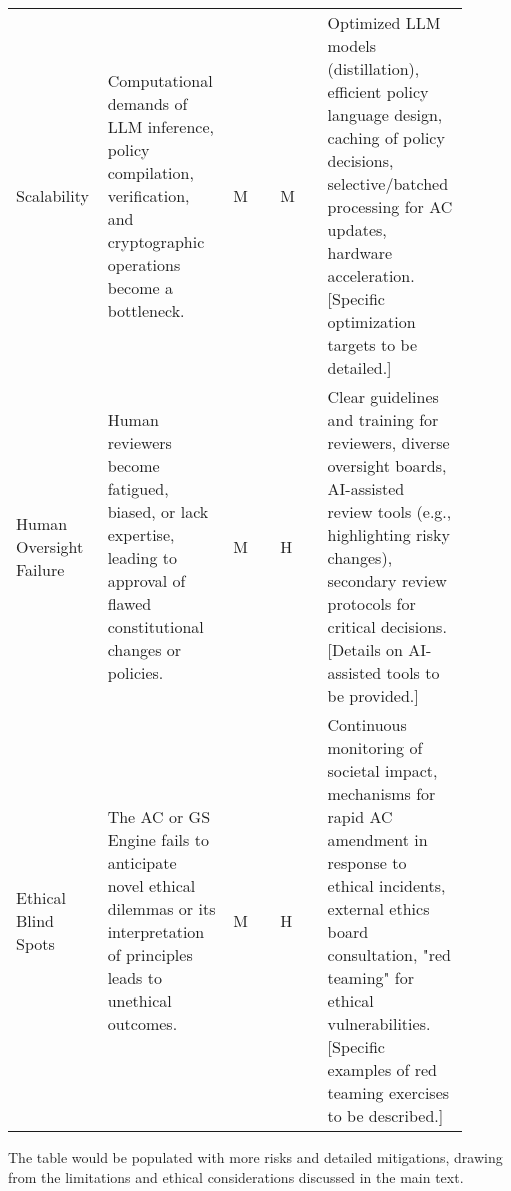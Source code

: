 \documentclass[sigconf,review,screen]{acmart}
\begin{document}
\begin{table*}[htbp]
\begin{tabular}{@{}p{0.15\linewidth}p{0.25\linewidth}p{0.1\linewidth}p{0.1\linewidth}p{0.3\linewidth}@{}}
    \addlinespace
    Scalability & Computational demands of LLM inference, policy compilation, verification, and cryptographic operations become a bottleneck. & M & M & Optimized LLM models (distillation), efficient policy language design, caching of policy decisions, selective/batched processing for AC updates, hardware acceleration. [Specific optimization targets to be detailed.] \\
    \addlinespace
    Human Oversight Failure & Human reviewers become fatigued, biased, or lack expertise, leading to approval of flawed constitutional changes or policies. & M & H & Clear guidelines and training for reviewers, diverse oversight boards, AI-assisted review tools (e.g., highlighting risky changes), secondary review protocols for critical decisions. [Details on AI-assisted tools to be provided.] \\
    \addlinespace
    Ethical Blind Spots & The AC or GS Engine fails to anticipate novel ethical dilemmas or its interpretation of principles leads to unethical outcomes. & M & H & Continuous monitoring of societal impact, mechanisms for rapid AC amendment in response to ethical incidents, external ethics board consultation, "red teaming" for ethical vulnerabilities. [Specific examples of red teaming exercises to be described.] \\
    \bottomrule
  \end{tabular}
\end{table*}
The table would be populated with more risks and detailed mitigations, drawing from the limitations and ethical considerations discussed in the main text.

\balance %
\end{document}
